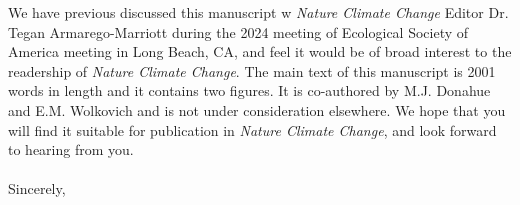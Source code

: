 \documentclass{article}[12pt]
\begin{document}
We have previous discussed this manuscript w \emph{Nature Climate Change} Editor Dr. Tegan Armarego-Marriott during the 2024 meeting of Ecological Society of America meeting in Long Beach, CA, and feel it would be of broad interest to the readership of \emph{Nature Climate Change}. The main text of this manuscript is 2001 words in length and it contains two figures. It is co-authored by M.J. Donahue and E.M. Wolkovich and is not under consideration elsewhere. We hope that you will find it suitable for publication in \textit{Nature Climate Change}, and look forward to hearing from you.\\\
\\Sincerely,\\\\\\



\newpage

\end{document}
